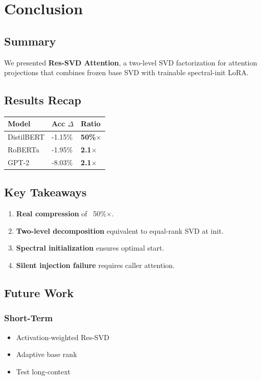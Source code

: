 \section{Conclusion}

\subsection{Summary}

We presented \textbf{Res-SVD Attention}, a two-level SVD factorization for 
attention projections that combines frozen base SVD with trainable 
spectral-init LoRA.

\subsection{Results Recap}

\begin{table}[H]
\centering
\small
\begin{tabular}{lll}
\toprule
\textbf{Model} & \textbf{Acc $\Delta$} & \textbf{Ratio} \\
\midrule
DistilBERT & -1.15\% & \textbf{50\%$\times$} \\
RoBERTa & -1.95\% & \textbf{2.1$\times$} \\
GPT-2 & -8.03\% & \textbf{2.1$\times$} \\
\bottomrule
\end{tabular}
\end{table}

\subsection{Key Takeaways}

\begin{enumerate}
\item \textbf{Real compression} of ~50\%$\times$.
\item \textbf{Two-level decomposition} equivalent to equal-rank SVD at init.
\item \textbf{Spectral initialization} ensures optimal start.
\item \textbf{Silent injection failure} requires caller attention.

\end{enumerate}
\subsection{Future Work}

\subsubsection{Short-Term}
\begin{itemize}
\item Activation-weighted Res-SVD
\item Adaptive base rank
\item Test long-context

\end{itemize}
